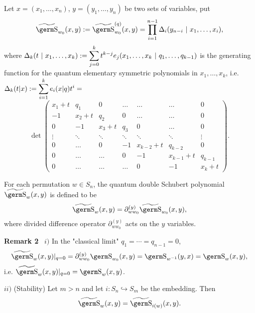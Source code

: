 {Let $x=(x_1,\ldots ,x_n)$, $y=(y_1,\ldots ,y_n)$ be two sets of 
variables, put
$$\wt{\s}_{w_0}(x,y):=\wt{\s}_{w_0}^{(q)}(x,y)=
\prod_{i=1}^{n-1}\Delta_i(y_{n-i}~|~x_1,\ldots ,x_i),
$$
where $\Delta_k(t~|~x_1,\ldots ,x_k):=\displaystyle\sum_{j=0}^kt^{k-j}
e_j(x_1,\ldots ,x_k~|~q_1,\ldots ,q_{k-1})$ is the generating function 
for the quantum elementary symmetric polynomials in $x_1,\ldots ,x_k$,
i.e. ~~
$ \Delta_k(t|x):=\displaystyle\sum_{i=1}^ke_i(x|q)t^i=$
\begin{equation}
\det\left(\begin{array}{ccccccc} x_1+t & q_1&0 &\ldots &\ldots 
&\ldots &0\\
-1 & x_2+t & q_2 &0 &\ldots &\ldots & 0\\
0 & -1 &x_3+t & q_3 & 0 &\ldots & 0 \\
\vdots &\ddots &\ddots & \ddots &\ddots &\ddots &\vdots \\
0&\ldots & 0 &-1&x_{k-2}+t &q_{k-2} & 0 \\
0 &\ldots &\ldots & 0 &-1 & x_{k-1}+t & q_{k-1}\\
0 &  \ldots &\ldots &\ldots & 0 & -1 & x_k+t
\end{array}\right) .
\end{equation}
\vskip 0.5cm

\begin{de} For each permutation $w\in S_n$, the quantum double Schubert 
polynomial $\wt{\s}_w(x,y)$ is defined to be
$$\wt{\s}_w(x,y)=\partial_{ww_0}^{(y)}\wt{\s}_{w_0}(x,y),
$$
where divided difference operator $\partial_{ww_0}^{(y)}$ acts on the $y$ 
variables.
\end{de}
{\bf Remark 2} \  $i)$ In the "classical limit" $q_1=\cdots =q_{n-1}=0$,
$$\wt{\s}_w(x,y)|_{q=0}=\partial_{ww_0}^{(y)}\s_{w_0}(x,y)=\s_{w^{-1}}(y,x)=
\s_w(x,y),
$$
i.e. $\wt{\s}_w(x,y)|_{q=0}=\s_w(x,y)$.

$ii)$ (Stability) Let $m>n$ and let $i:S_n\hookrightarrow S_m$ be the 
embedding. Then
$$\wt{\s}_w(x,y)=\wt{\s}_{i(w)}(x,y).
$$

}
